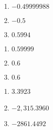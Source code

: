\begin{multicols}{3}
\begin{enumerate}	\setcounter{enumi}{\value{Review}} 
\item $-0.49999988$
\item $-0.5$
\item $0.5994$
\end{enumerate}	\setcounter{Review}{\value{enumi}}
\end{multicols}
\begin{multicols}{3}
\begin{enumerate}	\setcounter{enumi}{\value{Review}} 
\item $0.59999$
\item $0.6$
\item $0.6$
\end{enumerate}	\setcounter{Review}{\value{enumi}}
\end{multicols}
\begin{multicols}{3}
\begin{enumerate}	\setcounter{enumi}{\value{Review}} 
\item 3.3923
\item $-2,315.3960$
\item $-2861.4492$
\end{enumerate}
\end{multicols}